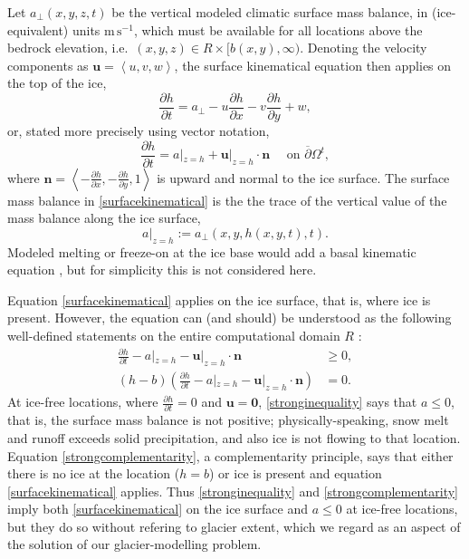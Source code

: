 \documentclass[letterpaper,final,12pt,reqno]{amsart}
\newcommand{\bn}{\mathbf{n}}
\newcommand{\bu}{\mathbf{u}}
\newcommand{\bzero}{\bm{0}}
\begin{document}
Let $a_\perp(x,y,z,t)$ be the vertical modeled climatic surface mass balance, in (ice-equivalent) units $\text{m}\,\text{s}^{-1}$, which must be available for all locations above the bedrock elevation, i.e.~$(x,y,z) \in R\times[b(x,y),\infty)$.  Denoting the velocity components as $\bu=\left<u,v,w\right>$, the surface kinematical equation \cite{GreveBlatter2009} then applies on the top of the ice,
    $$\frac{\partial h}{\partial t} = a_\perp - u \frac{\partial h}{\partial x} - v \frac{\partial h}{\partial y} + w,$$
or, stated more precisely using vector notation,
\begin{equation}
\frac{\partial h}{\partial t} = a|_{z=h} + \bu|_{z=h} \cdot \bn \quad \text{ on } \overline{\partial}\Omega^t, \label{surfacekinematical}
\end{equation}
where $\bn = \left<-\frac{\partial h}{\partial x},-\frac{\partial h}{\partial y},1\right>$ is upward and normal to the ice surface.  The surface mass balance in \eqref{surfacekinematical} is the the trace \cite{Evans2010} of the vertical value of the mass balance along the ice surface,
    $$a|_{z=h} := a_{\perp}(x,y,h(x,y,t),t).$$
Modeled melting or freeze-on at the ice base would add a basal kinematic equation \cite[for example]{Aschwandenetal2012}, but for simplicity this is not considered here.

Equation \eqref{surfacekinematical} applies on the ice surface, that is, where ice is present.  However, the equation can (and should) be understood as the following well-defined statements on the entire computational domain $R$ \cite{Bueler2016,Bueler2020,SchoofHewitt2013}:
\begin{align}
\frac{\partial h}{\partial t} - a|_{z=h} - \bu|_{z=h} \cdot \bn &\ge 0, \label{stronginequality} \\
(h-b) \left(\frac{\partial h}{\partial t} - a|_{z=h} - \bu|_{z=h} \cdot \bn\right) &= 0. \label{strongcomplementarity}
\end{align}
At ice-free locations, where $\frac{\partial h}{\partial t}=0$ and $\bu=\bzero$, \eqref{stronginequality} says that $a \le 0$, that is, the surface mass balance is not positive; physically-speaking, snow melt and runoff exceeds solid precipitation, and also ice is not flowing to that location.  Equation \eqref{strongcomplementarity}, a complementarity principle, says that either there is no ice at the location ($h=b$) or ice is present and equation \eqref{surfacekinematical} applies.  Thus \eqref{stronginequality} and \eqref{strongcomplementarity} imply both \eqref{surfacekinematical} on the ice surface and $a\le 0$ at ice-free locations, but they do so without refering to glacier extent, which we regard as an aspect of the solution of our glacier-modelling problem.
\end{document}
